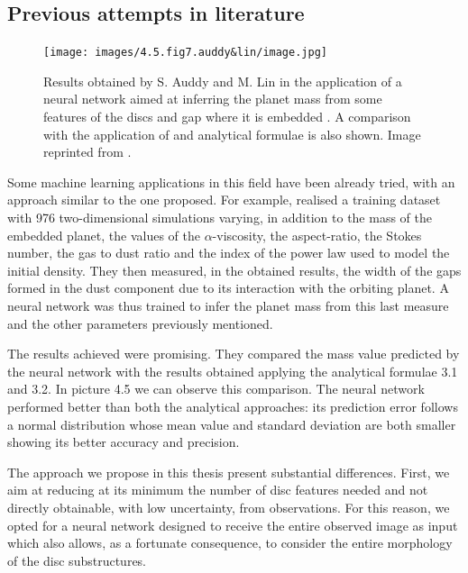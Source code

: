 \documentclass[a4paper,10pt]{report}
\begin{document}
\subsection{Previous attempts in literature}

\begin{figure}
    \begin{center}
        \texttt{[image: images/4.5.fig7.auddy\&lin/image.jpg]}
    \end{center}
    \caption{Results obtained by S. Auddy and M. Lin in the application
    of a neural network aimed at inferring the planet mass from some features of the discs
    and gap where it is embedded \citep{Auddy_2020}. A comparison with the application of \citet{Lodato_2019} and 
     \citet{kanagawa} analytical formulae is also shown.
    Image reprinted from \citet{Auddy_2020}.}
\end{figure}

Some machine learning applications in this field have been already tried, 
with an approach similar to the one proposed. For example,
\citet{Auddy_2020} realised a training dataset with 976 two-dimensional simulations varying, in addition to the mass of the embedded planet, the values of the $\alpha$-viscosity, the aspect-ratio, the Stokes number, the gas to dust ratio and the index of the power law used to model 
the initial density. 
They then measured, in the obtained results, the width of the gaps formed in the
dust component due to its interaction with the orbiting planet. A neural network
was thus trained to infer the planet mass from this last measure and the other parameters previously mentioned.

The results achieved were promising. They compared the mass value predicted by the neural network
with the results obtained applying the analytical formulae 3.1 and 3.2.
In picture 4.5 we can observe this comparison.
The neural network performed better than both the analytical approaches: its prediction error
follows a normal distribution whose mean value and standard deviation are both smaller showing its
better accuracy and precision.

The approach we propose in this thesis present substantial differences. 
First, we aim at reducing at its minimum the number of disc features needed and not 
directly obtainable, with low uncertainty, from observations.
For this reason, we opted for a neural network designed to receive the entire
observed image as input which also allows, as a fortunate consequence, to consider the entire morphology of the disc substructures.
\end{document}
